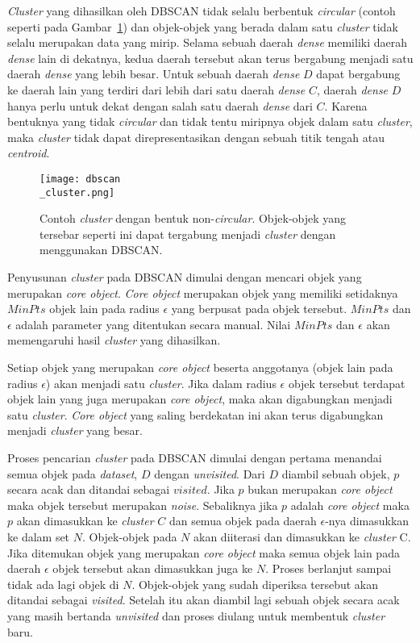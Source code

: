 \textit{Cluster} yang dihasilkan oleh DBSCAN tidak selalu berbentuk \textit{circular} (contoh seperti pada Gambar~\ref{fig:dbscan_cluster}) dan objek-objek yang berada dalam satu \textit{cluster} tidak selalu merupakan data yang mirip. Selama sebuah daerah \textit{dense} memiliki daerah \textit{dense} lain di dekatnya, kedua daerah tersebut akan terus bergabung menjadi satu daerah \textit{dense} yang lebih besar. Untuk sebuah daerah \textit{dense} $D$ dapat bergabung ke daerah lain yang terdiri dari lebih dari satu daerah \textit{dense} $C$, daerah \textit{dense} $D$ hanya perlu untuk dekat dengan salah satu daerah \textit{dense} dari $C$. Karena bentuknya yang tidak \textit{circular} dan tidak tentu miripnya objek dalam satu \textit{cluster}, maka \textit{cluster} tidak dapat direpresentasikan dengan sebuah titik tengah atau \textit{centroid}.

\begin{figure}[H]
	\centering
	\texttt{[image: dbscan\\\_cluster.png]}
	\caption{Contoh \textit{cluster} dengan bentuk non-\textit{circular}. Objek-objek yang tersebar seperti ini dapat tergabung menjadi \textit{cluster} dengan menggunakan DBSCAN.}
	\label{fig:dbscan_cluster}
\end{figure}

Penyusunan \textit{cluster} pada DBSCAN dimulai dengan mencari objek yang merupakan \textit{core object}. \textit{Core object} merupakan objek yang memiliki setidaknya $MinPts$ objek lain pada radius $\epsilon$ yang berpusat pada objek tersebut. $MinPts$ dan $\epsilon$ adalah parameter yang ditentukan secara manual. Nilai $MinPts$ dan $\epsilon$ akan memengaruhi hasil \textit{cluster} yang dihasilkan.

Setiap objek yang merupakan \textit{core object} beserta anggotanya (objek lain pada radius $\epsilon$) akan menjadi satu \textit{cluster}. Jika dalam radius $\epsilon$ objek tersebut terdapat objek lain yang juga merupakan \textit{core object}, maka akan digabungkan menjadi satu \textit{cluster}. \textit{Core object} yang saling berdekatan ini akan terus digabungkan menjadi \textit{cluster} yang besar.

Proses pencarian \textit{cluster} pada DBSCAN dimulai dengan pertama menandai semua objek pada \textit{dataset}, $D$ dengan \textit{unvisited}. Dari $D$ diambil sebuah objek, $p$ secara acak dan ditandai sebagai $visited$. Jika $p$ bukan merupakan \textit{core object} maka objek tersebut merupakan \textit{noise}. Sebaliknya jika $p$ adalah \textit{core object} maka $p$ akan dimasukkan ke \textit{cluster} $C$ dan semua objek pada daerah $\epsilon$-nya dimasukkan ke dalam set $N$. Objek-objek pada $N$ akan diiterasi dan dimasukkan ke \textit{cluster} C. Jika ditemukan objek yang merupakan \textit{core object} maka semua objek lain pada daerah $\epsilon$ objek tersebut akan dimasukkan juga ke $N$. Proses berlanjut sampai tidak ada lagi objek di $N$. Objek-objek yang sudah diperiksa tersebut akan ditandai sebagai \textit{visited}. Setelah itu akan diambil lagi sebuah objek secara acak yang masih bertanda \textit{unvisited} dan proses diulang untuk membentuk \textit{cluster} baru.

